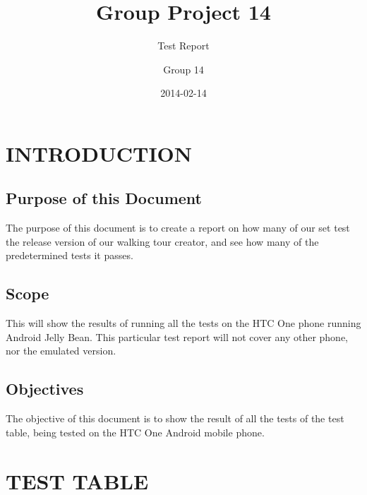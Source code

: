 \documentclass{project}
\begin{document}
\title{Group Project 14}

\subtitle{Test Report}
\author{Group 14}
\date{2014-02-14}

\maketitle
\tableofcontents
\newpage


\section{INTRODUCTION}

\subsection{Purpose of this Document}
The purpose of this document is to create a report on how many of our set
test the release version of our walking tour creator, and see how many of the 
predetermined tests it passes. 


\subsection{Scope}
This will show the results of running all the tests on the HTC One phone running Android Jelly Bean.
This particular test report will not cover any other phone, nor the emulated version.

\subsection{Objectives}
The objective of this document is to show the result of all the tests of the test table, being tested
on the HTC One Android mobile phone.


\clearpage

\section{TEST TABLE}
\end{document}
